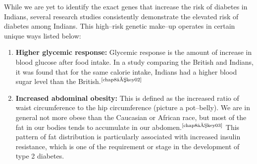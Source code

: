 While we are yet to identify the exact genes that increase the risk of diabetes in Indians, several research studies consistently demonstrate the elevated risk of diabetes among Indians. This high–risk genetic make–up operates in certain unique ways listed below:

\vspace{-\topsep}
\begin{enumerate}
\itemsep=0pt
\item \textbf{Higher glycemic response:} Glycemic response is the amount of increase in blood glucose after food intake. In a study comparing the British and Indians, it was found that for the same calorie intake, Indians had a higher blood sugar level than the British.$^{\text{\cite{chap8–key02}}}$
\item \textbf{Increased abdominal obesity:} This is defined as the increased ratio of waist circumference to the hip circumference (picture a pot–belly). We are in general not more obese than the Cauca\-sian or African race, but most of the fat in our bodies tends to accumulate in our abdomen.$^{\text{\cite{chap8–key03}}}$ This pattern of fat distribution is particularly associated with increased insulin resistance, which is one of the requirement or stage in the development of type 2 diabetes.


\end{enumerate}
